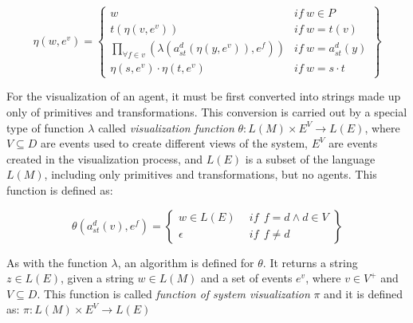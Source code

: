 \documentclass{aamas2012}
\begin{document}
\begin{small}
\begin{equation}
    \eta (w, e^v) = \left\{
    \begin{array}{ll}
        w   & \mathit{if}  \ w \in P  \\

        t(\eta (v, e^v))    & \mathit{if}  \  w = t(v)  \\

        \underset{\forall f \in v}{ \prod }(\lambda (a_{st}^d (\eta
            (y, e^v)), e^f))    & \mathit{if}  \ w = a_{st}^d(y) \\

        \eta (s, e^v) \cdot \eta (t, e^v)   & \mathit{if} \  w = s \cdot t
    \end{array}\right\}
\end{equation}
\end{small}

For the visualization of an agent, it must be first converted into strings made up only
of primitives and transformations. This conversion is carried out by a special type of function $\lambda$
called \textit{visualization function} $\theta: L(M) \times E^V \rightarrow L(E)$, where
$V \subseteq D$ are events used to create different views of the system, $E^V$ are events
created in the visualization process, and $L(E)$
is a subset of the language $L(M)$, including only primitives and transformations, but no agents. This function is defined as:

\begin{small}
\begin{equation}
    \theta (a_{st}^d(v), e^f) =
    \left\{
    \begin{array}{ll}
        w \in L(E) & \ \ \mathit{if}  \ \ f = d \wedge d \in V \\
        \epsilon  & \ \ \mathit{if}  \ \ f \neq d
    \end{array}\right\}
\end{equation}
\end{small}

As with the function $\lambda$, an algorithm is defined for $\theta$. It returns a string $z \in
L(E)$, given a string $w \in L(M)$ and a set of events $e^v$, where $v \in V^+$ and $V \subseteq
D$. This function is called \textit{function of system visualization} $\pi$ and it is defined as:
$\pi: L(M) \times E^V \rightarrow L(E)$
\end{document}
